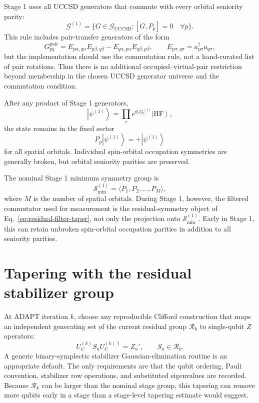 \documentclass[11pt]{article}
\newcommand{\ket}[1]{\left|#1\right\rangle}
\newcommand{\uccsd}{\mathcal G_{\mathrm{UCCSD}}}
\newcommand{\resgrp}{\mathcal R_k}
\begin{document}
Stage 1 uses all UCCSD generators that commute with every orbital seniority parity:
\begin{equation}
    \mathcal G^{(1)}
    = \{G\in\uccsd:[G,P_p]=0\quad \forall p\}.
\end{equation}
This rule includes pair-transfer generators of the form
\begin{equation}
    G_{pq}^{\mathrm{pair}}
    = E_{p\alpha,q\alpha}E_{p\beta,q\beta}
    - E_{q\alpha,p\alpha}E_{q\beta,p\beta},
    \qquad
    E_{p\sigma,q\sigma}=a_{p\sigma}^{\dagger}a_{q\sigma},
\end{equation}
but the implementation should use the commutation rule, not a hand-curated list of pair rotations. Thus there is no additional occupied--virtual-pair restriction beyond membership in the chosen UCCSD generator universe and the commutation condition.

After any product of Stage 1 generators,
\begin{equation}
    \ket{\psi^{(1)}}=\prod_r e^{\theta_r G_r^{(1)}}\ket{\mathrm{HF}},
\end{equation}
the state remains in the fixed sector
\begin{equation}
    P_p\ket{\psi^{(1)}}=+\ket{\psi^{(1)}}
\end{equation}
for all spatial orbitals. Individual spin-orbital occupation symmetries are generally broken, but orbital seniority parities are preserved.

The nominal Stage 1 minimum symmetry group is
\begin{equation}
    \mathcal S_{\min}^{(1)}=\langle P_1,P_2,\ldots,P_M\rangle,
\end{equation}
where $M$ is the number of spatial orbitals. During Stage 1, however, the filtered commutator used for measurement is the residual-symmetry object of Eq.~\eqref{eq:residual-filter-taper}, not only the projection onto $\mathcal S_{\min}^{(1)}$. Early in Stage 1, this can retain unbroken spin-orbital occupation parities in addition to all seniority parities.

\section{Tapering with the residual stabilizer group}

At ADAPT iteration $k$, choose any reproducible Clifford construction that maps an independent generating set of the current residual group $\resgrp$ to single-qubit $Z$ operators:
\begin{equation}
    U_{\mathrm C}^{(k)} S_a U_{\mathrm C}^{(k)\dagger}=Z_a',
    \qquad S_a\in\resgrp .
\end{equation}
A generic binary-symplectic stabilizer Gaussian-elimination routine is an appropriate default. The only requirements are that the qubit ordering, Pauli convention, stabilizer row operations, and substituted eigenvalues are recorded. Because $\resgrp$ can be larger than the nominal stage group, this tapering can remove more qubits early in a stage than a stage-level tapering estimate would suggest.
\end{document}
